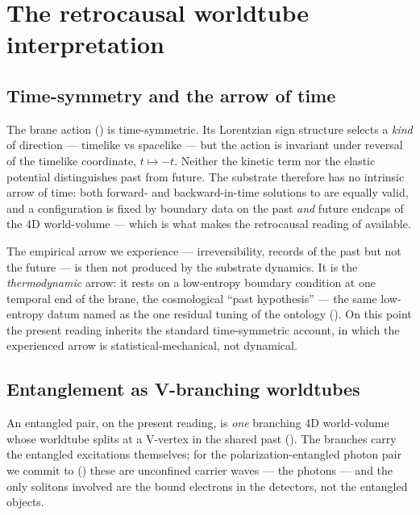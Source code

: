\section{The retrocausal worldtube interpretation}
\label{sec:worldtube}

\subsection{Time-symmetry and the arrow of time}
\label{subsec:time-symmetry}

The brane action () is time-symmetric.
Its Lorentzian sign structure selects a \emph{kind} of direction --- timelike vs spacelike ---
but the action is invariant under reversal of the timelike coordinate, $t\mapsto -t$.
Neither the kinetic term nor the elastic potential distinguishes past from future.
The substrate therefore has no intrinsic arrow of time: both forward- and backward-in-time
solutions to  are equally valid, and a configuration is fixed by boundary data
on the past \emph{and} future endcaps of the 4D world-volume --- which is what makes the
retrocausal reading of  available.

The empirical arrow we experience --- irreversibility, records of the past but not the future ---
is then not produced by the substrate dynamics. It is the \emph{thermodynamic} arrow: it rests on
a low-entropy boundary condition at one temporal end of the brane, the cosmological ``past
hypothesis'' \citep{Albert2000TimeAndChance,PriceWharton2015Retrocausality} --- the same
low-entropy datum named as the one residual tuning of the ontology
(). On this point the present reading inherits the standard
time-symmetric account, in which the experienced arrow is statistical-mechanical, not dynamical.

\subsection{Entanglement as V-branching worldtubes}
\label{subsec:v-branching}

An entangled pair, on the present reading, is \emph{one} branching 4D world-volume whose worldtube
splits at a V-vertex in the shared past ().
The branches carry the entangled excitations themselves; for the polarization-entangled photon
pair we commit to () these are unconfined carrier waves --- the
photons --- and the only solitons involved are the bound electrons in the detectors, not the
entangled objects.

